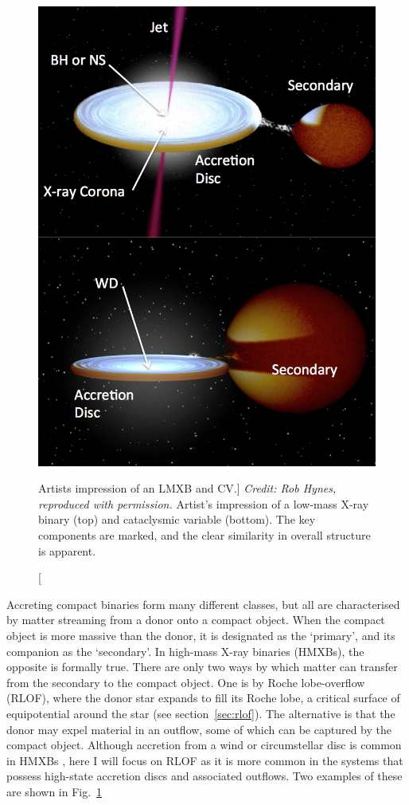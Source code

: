 \begin{figure}
\centering
\includegraphics[width=1.0\textwidth]{figures/01-intro/cv_and_xrb.png}
\caption
[Artists impression of an LMXB and CV.]
{
{\sl Credit: Rob Hynes, reproduced with permission.} 
Artist's impression of a low-mass X-ray binary (top) and
cataclysmic variable (bottom). The key components are marked,
and the clear similarity in overall structure is apparent.
} 
\label{fig:cv_and_xrb}
\end{figure}

Accreting compact binaries form many different classes, 
but all are characterised by matter streaming from a donor
onto a compact object. When the compact object is more massive 
than the donor, it is designated as the `primary', 
and its companion as the `secondary'. 
In high-mass X-ray binaries (HMXBs), the opposite is formally true.
There are only two ways by which matter can transfer 
from the secondary to the compact object. One is by Roche lobe-overflow (RLOF),
where the donor star expands to fill its Roche lobe, a critical surface
of equipotential around the star (see section~\ref{sec:rlof}). 
The alternative is that the donor may expel
material in an outflow, some of which can be captured by the compact object. 
Although accretion from a wind or circumstellar disc is common in 
HMXBs \citep{bartlett2013}, here I will focus on 
RLOF as it is more common in the systems that possess high-state accretion discs
and associated outflows. Two examples of these are shown in Fig.~\ref{fig:cv_and_xrb}

